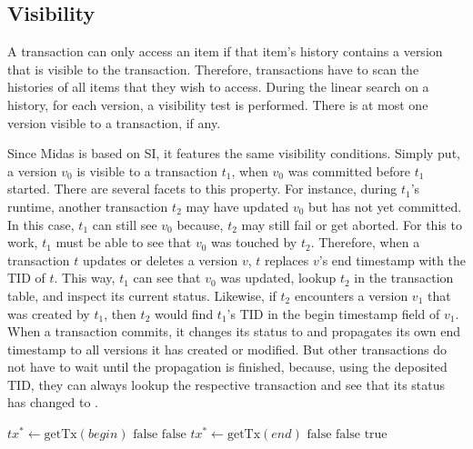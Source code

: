 \subsection{Visibility}
\label{ch:impl-vsb}

A transaction can only access an item if that item's history contains a version that is visible to the transaction. Therefore, transactions have to scan the histories of all items that they wish to access. During the linear search on a history, for each version, a visibility test is performed. There is at most one version visible to a transaction, if any.

Since Midas is based on SI, it features the same visibility conditions. Simply
put, a version $v_0$ is visible to a transaction $t_1$, when $v_0$ was committed
before $t_1$ started. There are several facets to this property. For instance,
during $t_1$'s runtime, another transaction $t_2$ may have updated $v_0$ but has
not yet committed. In this case, $t_1$ can still see $v_0$ because, $t_2$ may
still fail or get aborted. For this to work, $t_1$ must be able to see that
$v_0$ was touched by $t_2$. Therefore, when a transaction $t$ updates or deletes
a version $v$, $t$ replaces $v$'s end timestamp with the TID of $t$. This way,
$t_1$ can see that $v_0$ was updated, lookup $t_2$ in the transaction table, and
inspect its current status. Likewise, if $t_2$ encounters a version $v_1$ that
was created by $t_1$, then $t_2$ would find $t_1$'s TID in the begin timestamp
field of $v_1$. When a transaction commits, it changes its status to
 and propagates its own end timestamp to all versions it has
created or modified. But other transactions do not have to wait until the
propagation is finished, because, using the deposited TID, they can always
lookup the respective transaction and see that its status has changed to
.

\begin{algorithm}
\begin{algorithmic}[1]
\State $\textit{tx}^{*} \gets \text{getTx}(\textit{begin})$
\State \Return $\text{false}$
\EndIf
\Else
{}
\State \Return $\text{false}$
\EndIf
\EndIf
\State
{}
\State $\textit{tx}^{*} \gets \text{getTx}(\textit{end})$
\State \Return $\text{false}$
\EndIf
\Else
{}
\State \Return $\text{false}$
\EndIf
\EndIf
\State \Return $\text{true}$
\EndProcedure
\end{algorithmic}
\caption{}
\label{alg:vsb}
\end{algorithm}

